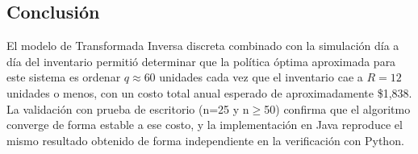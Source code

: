 \subsection{Conclusión}

El modelo de Transformada Inversa discreta combinado con la simulación día a día del inventario permitió determinar que la política óptima aproximada para este sistema es ordenar $q \approx 60$ unidades cada vez que el inventario cae a $R=12$ unidades o menos, con un costo total anual esperado de aproximadamente \$1,838. La validación con prueba de escritorio (n=25 y n$\geq$50) confirma que el algoritmo converge de forma estable a ese costo, y la implementación en Java reproduce el mismo resultado obtenido de forma independiente en la verificación con Python.
